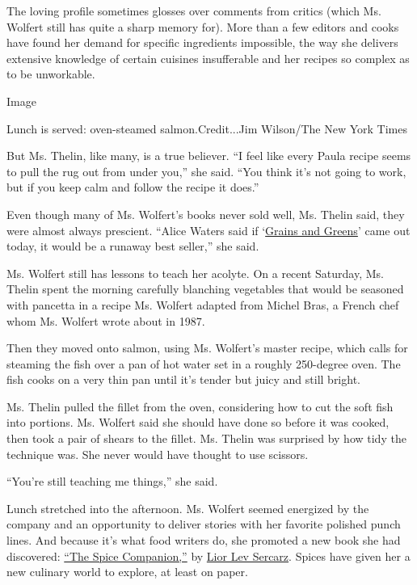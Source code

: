 The loving profile sometimes glosses over comments from critics (which
Ms. Wolfert still has quite a sharp memory for). More than a few editors
and cooks have found her demand for specific ingredients impossible, the
way she delivers extensive knowledge of certain cuisines insufferable
and her recipes so complex as to be unworkable.

Image

Lunch is served: oven-steamed salmon.Credit...Jim Wilson/The New York
Times

But Ms. Thelin, like many, is a true believer. ``I feel like every Paula
recipe seems to pull the rug out from under you,'' she said. ``You think
it's not going to work, but if you keep calm and follow the recipe it
does.''

Even though many of Ms. Wolfert's books never sold well, Ms. Thelin
said, they were almost always prescient. ``Alice Waters said if
`\href{http://www.slate.com/articles/news_and_politics/in_the_soup/1998/08/the_diva.html}{Grains
and Greens}' came out today, it would be a runaway best seller,'' she
said.

Ms. Wolfert still has lessons to teach her acolyte. On a recent
Saturday, Ms. Thelin spent the morning carefully blanching vegetables
that would be seasoned with pancetta in a recipe Ms. Wolfert adapted
from Michel Bras, a French chef whom Ms. Wolfert wrote about in 1987.

Then they moved onto salmon, using Ms. Wolfert's master recipe, which
calls for steaming the fish over a pan of hot water set in a roughly
250-degree oven. The fish cooks on a very thin pan until it's tender but
juicy and still bright.

Ms. Thelin pulled the fillet from the oven, considering how to cut the
soft fish into portions. Ms. Wolfert said she should have done so before
it was cooked, then took a pair of shears to the fillet. Ms. Thelin was
surprised by how tidy the technique was. She never would have thought to
use scissors.

``You're still teaching me things,'' she said.

Lunch stretched into the afternoon. Ms. Wolfert seemed energized by the
company and an opportunity to deliver stories with her favorite polished
punch lines. And because it's what food writers do, she promoted a new
book she had discovered:
\href{http://www.penguinrandomhouse.com/books/533132/the-spice-companion-by-lior-lev-sercarz/}{``The
Spice Companion,''} by
\href{https://www.nytimes3xbfgragh.onion/2016/11/02/dining/padma-lakshmi-lior-lev-sercarz-spice-guides.html}{Lior
Lev Sercarz}. Spices have given her a new culinary world to explore, at
least on paper.

